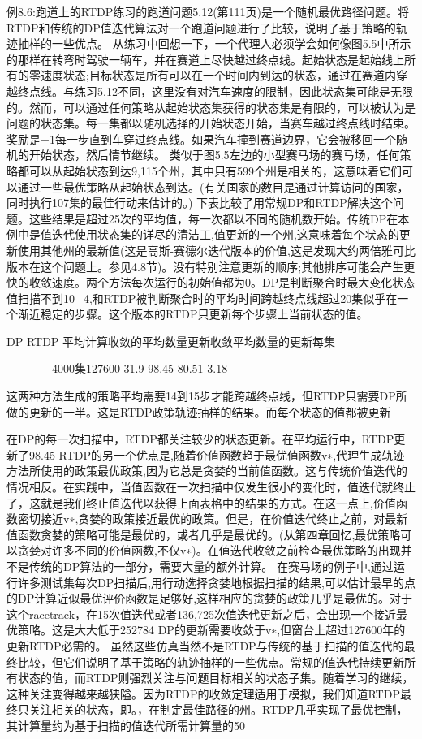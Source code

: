例8.6:跑道上的RTDP练习的跑道问题5.12(第111页)是一个随机最优路径问题。将RTDP和传统的DP值迭代算法对一个跑道问题进行了比较，说明了基于策略的轨迹抽样的一些优点。
从练习中回想一下，一个代理人必须学会如何像图5.5中所示的那样在转弯时驾驶一辆车，并在赛道上尽快越过终点线。起始状态是起始线上所有的零速度状态;目标状态是所有可以在一个时间内到达的状态，通过在赛道内穿越终点线。与练习5.12不同，这里没有对汽车速度的限制，因此状态集可能是无限的。然而，可以通过任何策略从起始状态集获得的状态集是有限的，可以被认为是问题的状态集。每一集都以随机选择的开始状态开始，当赛车越过终点线时结束。奖励是−1每一步直到车穿过终点线。如果汽车撞到赛道边界，它会被移回一个随机的开始状态，然后情节继续。
类似于图5.5左边的小型赛马场的赛马场，任何策略都可以从起始状态到达9,115个州，其中只有599个州是相关的，这意味着它们可以通过一些最优策略从起始状态到达。(有关国家的数目是通过计算访问的国家，同时执行107集的最佳行动来估计的。)
下表比较了用常规DP和RTDP解决这个问题。这些结果是超过25次的平均值，每一次都以不同的随机数开始。传统DP在本例中是值迭代使用状态集的详尽的清洁工,值更新的一个州,这意味着每个状态的更新使用其他州的最新值(这是高斯-赛德尔迭代版本的价值,这是发现大约两倍雅可比版本在这个问题上。参见4.8节)。没有特别注意更新的顺序;其他排序可能会产生更快的收敛速度。两个方法每次运行的初始值都为0。DP是判断聚合时最大变化状态值扫描不到10−4,和RTDP被判断聚合时的平均时间跨越终点线超过20集似乎在一个渐近稳定的步骤。这个版本的RTDP只更新每个步骤上当前状态的值。


	DP	RTDP
平均计算收敛的平均数量更新收敛平均数量的更新每集%

- - - - - -	4000集127600 31.9 98.45 80.51 3.18
	- - - - - -

这两种方法生成的策略平均需要14到15步才能跨越终点线，但RTDP只需要DP所做的更新的一半。这是RTDP政策轨迹抽样的结果。而每个状态的值都被更新

在DP的每一次扫描中，RTDP都关注较少的状态更新。在平均运行中，RTDP更新了98.45%
RTDP的另一个优点是,随着价值函数趋于最优值函数v∗,代理生成轨迹方法所使用的政策最优政策,因为它总是贪婪的当前值函数。这与传统价值迭代的情况相反。在实践中，当值函数在一次扫描中仅发生很小的变化时，值迭代就终止了，这就是我们终止值迭代以获得上面表格中的结果的方式。在这一点上,价值函数密切接近v∗,贪婪的政策接近最优的政策。但是，在价值迭代终止之前，对最新值函数贪婪的策略可能是最优的，或者几乎是最优的。(从第四章回忆,最优策略可以贪婪对许多不同的价值函数,不仅v∗)。在值迭代收敛之前检查最优策略的出现并不是传统的DP算法的一部分，需要大量的额外计算。
在赛马场的例子中,通过运行许多测试集每次DP扫描后,用行动选择贪婪地根据扫描的结果,可以估计最早的点的DP计算近似最优评价函数是足够好,这样相应的贪婪的政策几乎是最优的。对于这个racetrack，在15次值迭代或者136,725次值迭代更新之后，会出现一个接近最优策略。这是大大低于252784 DP的更新需要收敛于v∗,但窗台上超过127600年的更新RTDP必需的。
虽然这些仿真当然不是RTDP与传统的基于扫描的值迭代的最终比较，但它们说明了基于策略的轨迹抽样的一些优点。常规的值迭代持续更新所有状态的值，而RTDP则强烈关注与问题目标相关的状态子集。随着学习的继续，这种关注变得越来越狭隘。因为RTDP的收敛定理适用于模拟，我们知道RTDP最终只关注相关的状态，即。，在制定最佳路径的州。RTDP几乎实现了最优控制，其计算量约为基于扫描的值迭代所需计算量的50%


